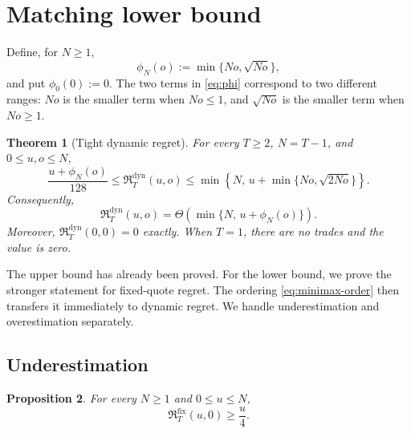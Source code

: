 \documentclass[11pt]{article}
\newtheorem{theorem}{Theorem}
\newtheorem{proposition}[theorem]{Proposition}
\theoremstyle{remark}
\newcommand{\Rstar}{\mathfrak R}
\begin{document}
\section{Matching lower bound}

Define, for $N\ge1$,
\begin{equation}\label{eq:phi}
  \phi_N(o):=\min\{No,\sqrt{No}\},
\end{equation}
and put $\phi_0(0):=0$.  The two terms in \eqref{eq:phi} correspond to two
different ranges: $No$ is the smaller term when $No\le1$, and
$\sqrt{No}$ is the smaller term when $No\ge1$.

\begin{theorem}[Tight dynamic regret]\label{thm:matching}
For every $T\ge2$, $N=T-1$, and $0\le u,o\le N$,
\begin{equation}\label{eq:matching}
  \frac{u+\phi_N(o)}{128}
  \le \Rstar_T^{\mathrm{dyn}}(u,o)
  \le
  \min\left\{
    N,\,
    u+\min\bigl\{No,\sqrt{2No}\bigr\}
  \right\}.
\end{equation}
Consequently,
\begin{equation}\label{eq:rate}
  \Rstar_T^{\mathrm{dyn}}(u,o)
  =\Theta\!\left(
     \min\{N,\,u+\phi_N(o)\}
   \right).
\end{equation}
Moreover, $\Rstar_T^{\mathrm{dyn}}(0,0)=0$ exactly.  When $T=1$, there are
no trades and the value is zero.
\end{theorem}

The upper bound has already been proved.  For the lower bound, we prove the
stronger statement for fixed-quote regret.  The ordering
\eqref{eq:minimax-order} then transfers it immediately to dynamic regret.
We handle underestimation and overestimation separately.

\subsection{Underestimation}

\begin{proposition}\label{prop:under-lower}
For every $N\ge1$ and $0\le u\le N$,
\[
  \Rstar_T^{\mathrm{fix}}(u,0)\ge\frac u4.
\]
\end{proposition}
\end{document}
